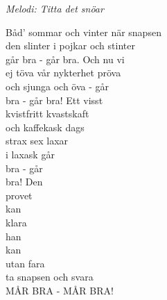 {\footnotesize\textit{Melodi: Titta det snöar}}
\begin{center}
  Båd' sommar och vinter när snapsen\\
  den slinter i pojkar och stinter\\
  går bra - går bra. Och nu vi\\
  ej töva vår nykterhet pröva\\
  och sjunga och öva - går\\
  bra - går bra! Ett visst\\
  kvistfritt kvastskaft\\
  och kaffekask dags\\
  strax sex laxar\\
  i laxask går\\
  bra - går\\
  bra! Den\\
  provet\\
  kan\\
  klara\\
  han\\
  kan\\
  utan fara\\
  ta snapsen och svara\\
  MÅR BRA - MÅR BRA!
\end{center}
